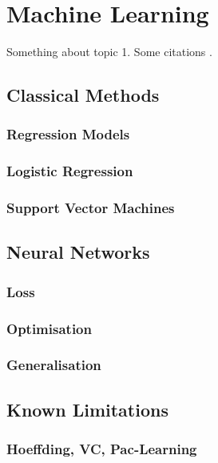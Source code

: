 \chapter{Machine Learning}
Something about topic 1. \lipsum[1] Some citations \cite{mittelbach2004companion, lamport1994latex, lesk1977computer}.

\section{Classical Methods}
\subsection{Regression Models}
\lipsum[1-3]

\subsection{Logistic Regression}
\lipsum[1-3]

\subsection{Support Vector Machines}
\lipsum[1-3]

\section{Neural Networks}
\lipsum[1-3]

\subsection{Loss}
\lipsum[1-3]

\subsection{Optimisation}
\lipsum[1-3]

\subsection{Generalisation}
\lipsum[1-3]

\section{Known Limitations}
\lipsum[1-3]
\subsection{Hoeffding, VC, Pac-Learning}
\lipsum[1-3]
